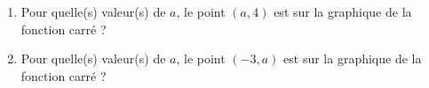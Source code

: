 
\begin{exercice}\label{exosmath-0180}

    \begin{enumerate}
        \item
            Pour quelle(s) valeur(s) de \( a\), le point \( (a,4)\) est sur la graphique de la fonction carré ?
        \item
            Pour quelle(s) valeur(s) de \( a\), le point \( (-3,a)\) est sur la graphique de la fonction carré ?
    \end{enumerate}

\end{exercice}
